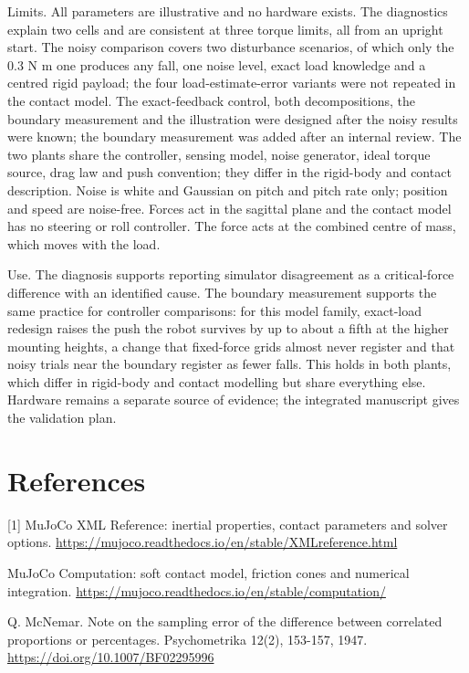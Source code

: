 \documentclass[11pt,a4paper]{article}
\begin{document}
Limits. All parameters are illustrative and no hardware exists. The diagnostics explain two cells and are consistent at three torque limits, all from an upright start. The noisy comparison covers two disturbance scenarios, of which only the 0.3 N m one produces any fall, one noise level, exact load knowledge and a centred rigid payload; the four load-estimate-error variants were not repeated in the contact model. The exact-feedback control, both decompositions, the boundary measurement and the illustration were designed after the noisy results were known; the boundary measurement was added after an internal review. The two plants share the controller, sensing model, noise generator, ideal torque source, drag law and push convention; they differ in the rigid-body and contact description. Noise is white and Gaussian on pitch and pitch rate only; position and speed are noise-free. Forces act in the sagittal plane and the contact model has no steering or roll controller. The force acts at the combined centre of mass, which moves with the load.

Use. The diagnosis supports reporting simulator disagreement as a critical-force difference with an identified cause. The boundary measurement supports the same practice for controller comparisons: for this model family, exact-load redesign raises the push the robot survives by up to about a fifth at the higher mounting heights, a change that fixed-force grids almost never register and that noisy trials near the boundary register as fewer falls. This holds in both plants, which differ in rigid-body and contact modelling but share everything else. Hardware remains a separate source of evidence; the integrated manuscript gives the validation plan.

\section*{References}
[1] MuJoCo XML Reference: inertial properties, contact parameters and solver options. \url{https://mujoco.readthedocs.io/en/stable/XMLreference.html}\par
[2] MuJoCo Computation: soft contact model, friction cones and numerical integration. \url{https://mujoco.readthedocs.io/en/stable/computation/}\par
[3] Q. McNemar. Note on the sampling error of the difference between correlated proportions or percentages. Psychometrika 12(2), 153-157, 1947. \url{https://doi.org/10.1007/BF02295996}\par
\end{document}
